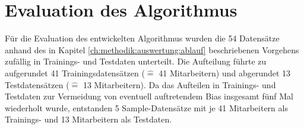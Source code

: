 

\section{Evaluation des Algorithmus}
Für die Evaluation des entwickelten Algorithmus wurden die 54 Datensätze anhand des in Kapitel \ref{ch:methodik:auswertung:ablauf} beschriebenen Vorgehens zufällig in Trainings- und Testdaten unterteilt.
Die Aufteilung führte zu aufgerundet 41 Trainingsdatensätzen ($\hat{=}$ 41 Mitarbeitern) und abgerundet 13 Testdatensätzen ($\hat{=}$ 13 Mitarbeitern).
Da das Aufteilen in Trainings- und Testdaten zur Vermeidung von eventuell auftretendem Bias insgesamt fünf Mal wiederholt wurde, entstanden 5 Sample-Datensätze mit je 41 Mitarbeitern als Trainings- und 13 Mitarbeitern als Testdaten.


